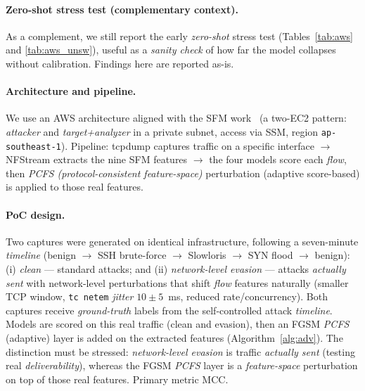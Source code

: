 \documentclass[preprint,12pt,authoryear]{elsarticle}
\begin{document}
\paragraph{Zero-shot stress test (complementary context).} As a complement, we still
report the early \emph{zero-shot} stress test (Tables~\ref{tab:aws} and
\ref{tab:aws_unsw}), useful as a \emph{sanity check} of how far the model collapses
without calibration. Findings here are reported as-is.

\paragraph{Architecture and pipeline.} We use an AWS architecture aligned with the
SFM work~\citep{martono2024sfm} (a two-EC2 pattern: \emph{attacker} and
\emph{target+analyzer} in a private subnet, access via SSM, region
\texttt{ap-southeast-1}). Pipeline: tcpdump captures traffic on a specific interface
$\rightarrow$ NFStream extracts the nine SFM features $\rightarrow$ the four models
score each \emph{flow}, then \emph{PCFS (protocol-consistent feature-space)}
perturbation (adaptive score-based) is applied to those real features.

\paragraph{PoC design.} Two captures were generated on identical infrastructure,
following a seven-minute \emph{timeline} (benign $\rightarrow$ SSH brute-force
$\rightarrow$ Slowloris $\rightarrow$ SYN flood $\rightarrow$ benign): (i)
\emph{clean} --- standard attacks; and (ii) \emph{network-level evasion} --- attacks
\emph{actually sent} with network-level perturbations that shift \emph{flow}
features naturally (smaller TCP window, \texttt{tc netem} \emph{jitter} $10\pm5$~ms,
reduced rate/concurrency). Both captures receive \emph{ground-truth} labels from the
self-controlled attack \emph{timeline}. Models are scored on this real traffic
(clean and evasion), then an FGSM \emph{PCFS} (adaptive) layer is added on the
extracted features (Algorithm~\ref{alg:adv}). The distinction must be stressed:
\emph{network-level evasion} is traffic \emph{actually sent} (testing real
\emph{deliverability}), whereas the FGSM \emph{PCFS} layer is a \emph{feature-space}
perturbation on top of those real features. Primary metric MCC.
\end{document}
